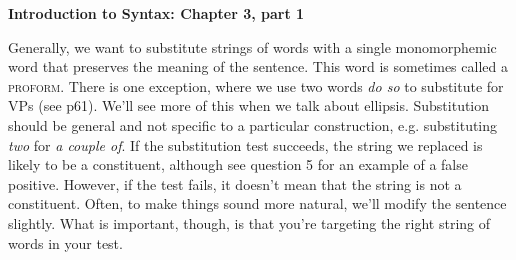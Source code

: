 \documentclass[a4paper,12pt]{article}
\begin{document}
\noindent\textbf{Introduction to Syntax: Chapter 3, part 1}\par
\noindent Generally, we want to substitute strings of words with a single monomorphemic word that preserves the meaning of the sentence. This word is sometimes called a \textsc{proform}. There is one exception, where we use two words \textit{do so} to substitute for VPs (see p61). We'll see more of this when we talk about ellipsis. Substitution should be general and not specific to a particular construction, e.g. substituting \textit{two} for \textit{a couple of}. If the substitution test succeeds, the string we replaced is likely to be a constituent, although see question 5 for an example of a false positive. However, if the test fails, it doesn't mean that the string is not a constituent. Often, to make things sound more natural, we'll modify the sentence slightly. What is important, though, is that you're targeting the right string of words in your test.
\end{document}
